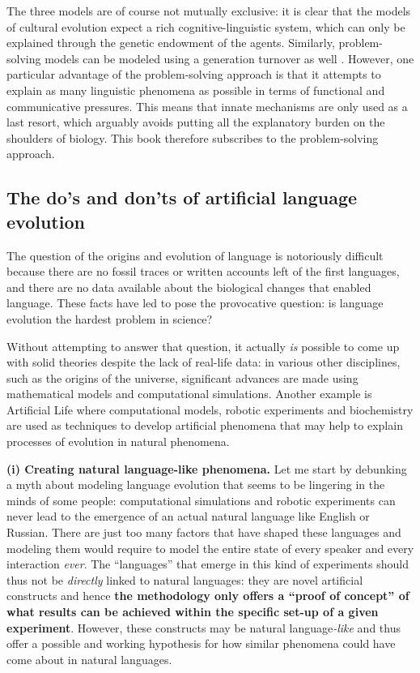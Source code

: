 The three models are of course not mutually exclusive: it is clear that the models of cultural evolution expect a rich cognitive-linguistic system, which can only be explained through the genetic endowment of the agents. Similarly, problem-solving models can be modeled using a generation turnover as well \citep{vogt07group}. However, one particular advantage of the problem-solving approach is that it attempts to explain as many linguistic phenomena as possible in terms of functional and communicative pressures. This means that innate mechanisms are only used as a last resort, which arguably avoids putting all the explanatory burden on the shoulders of biology. This book therefore subscribes to the problem-solving approach.

\subsection{The do's and don'ts of artificial language evolution}
\label{s:methodology}

The question of the origins and evolution of language is notoriously difficult because there are no fossil traces or written accounts left of the first languages, and there are no data available about the biological changes that enabled language. These facts have led \citet{kirby03language} to pose the provocative question: is language evolution the hardest problem in science?

Without attempting to answer that question, it actually {\em is} possible to come up with solid theories despite the lack of real-life data: in various other disciplines, such as the origins of the universe, significant advances are made using mathematical models and computational simulations. Another example is Artificial Life where computational models, robotic experiments and biochemistry are used as techniques to develop artificial phenomena that may help to explain processes of evolution in natural phenomena.

{\bfseries (i) Creating natural language-like phenomena.} Let me start by debunking a myth about modeling language evolution that seems to be lingering in the minds of some people: computational simulations and robotic experiments can never lead to the emergence of an actual natural language like English or Russian. There are just too many factors that have shaped these languages and modeling them would require to model the entire state of every speaker and every interaction {\em ever}. The ``languages'' that emerge in this kind of experiments should thus not be {\em directly} linked to natural languages: they are novel artificial constructs and hence {\bfseries the methodology only offers a ``proof of concept'' of what results can be achieved within the specific set-up of a given experiment}. However, these constructs may be natural language{\em -like} and thus offer a possible and working hypothesis for how similar phenomena could have come about in natural languages.

